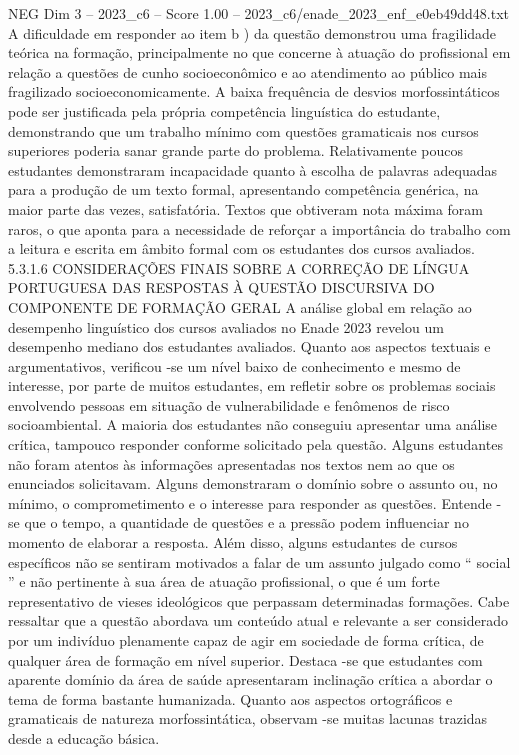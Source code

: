 \begin{textsample}{NEG Dim 3 – 2023\_c6 – Score 1.00 – 2023\_c6/enade\_2023\_enf\_e0eb49dd48.txt}
A dificuldade em responder ao item b ) da questão demonstrou uma fragilidade teórica na formação, principalmente no que concerne à atuação do profissional em relação a questões de cunho socioeconômico e ao atendimento ao público mais fragilizado socioeconomicamente.
A baixa frequência de desvios morfossintáticos pode ser justificada pela própria competência linguística do estudante, demonstrando que um trabalho mínimo com questões gramaticais nos cursos superiores poderia sanar grande parte do problema.
Relativamente poucos estudantes demonstraram incapacidade quanto à escolha de palavras adequadas para a produção de um texto formal, apresentando competência genérica, na maior parte das vezes, satisfatória.
Textos que obtiveram nota máxima foram raros, o que aponta para a necessidade de reforçar a importância do trabalho com a leitura e escrita em âmbito formal com os estudantes dos cursos avaliados. 5.3.1.6 CONSIDERAÇÕES FINAIS SOBRE A CORREÇÃO DE LÍNGUA PORTUGUESA DAS RESPOSTAS À QUESTÃO DISCURSIVA DO COMPONENTE DE FORMAÇÃO GERAL A análise global em relação ao desempenho linguístico dos cursos avaliados no Enade 2023 revelou um desempenho mediano dos estudantes avaliados.
Quanto aos aspectos textuais e argumentativos, verificou -se um nível baixo de conhecimento e mesmo de interesse, por parte de muitos estudantes, em refletir sobre os problemas sociais envolvendo pessoas em situação de vulnerabilidade e fenômenos de risco socioambiental.
A maioria dos estudantes não conseguiu apresentar uma análise crítica, tampouco responder conforme solicitado pela questão.
Alguns estudantes não foram atentos às informações apresentadas nos textos nem ao que os enunciados solicitavam.
Alguns demonstraram o domínio sobre o assunto ou, no mínimo, o comprometimento e o interesse para responder as questões.
Entende -se que o tempo, a quantidade de questões e a pressão podem influenciar no momento de elaborar a resposta.
Além disso, alguns estudantes de cursos específicos não se sentiram motivados a falar de um assunto julgado como “ social ” e não pertinente à sua área de atuação profissional, o que é um forte representativo de vieses ideológicos que perpassam determinadas formações.
Cabe ressaltar que a questão abordava um conteúdo atual e relevante a ser considerado por um indivíduo plenamente capaz de agir em sociedade de forma crítica, de qualquer área de formação em nível superior.
Destaca -se que estudantes com aparente domínio da área de saúde apresentaram inclinação crítica a abordar o tema de forma bastante humanizada.
Quanto aos aspectos ortográficos e gramaticais de natureza morfossintática, observam -se muitas lacunas trazidas desde a educação básica.

\end{textsample}

